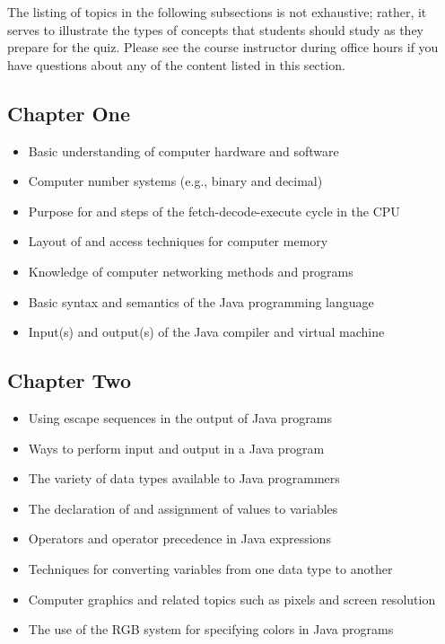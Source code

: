 The listing of topics in the following subsections is not exhaustive; rather, it serves to illustrate the types of
concepts that students should study as they prepare for the quiz. Please see the course instructor during office hours
if you have questions about any of the content listed in this section.

\vspace*{-.1in}
\subsection*{Chapter One}

\begin{itemize}

  \itemsep 0in
  \item Basic understanding of computer hardware and software
  \item Computer number systems (e.g., binary and decimal)
  \item Purpose for and steps of the fetch-decode-execute cycle in the CPU
  \item Layout of and access techniques for computer memory
  \item Knowledge of computer networking methods and programs
  \item Basic syntax and semantics of the Java programming language
  \item Input(s) and output(s) of the Java compiler and virtual machine

  \end{itemize}

\vspace*{-.2in}
\subsection*{Chapter Two}

\begin{itemize}

  \itemsep 0in
  \item Using escape sequences in the output of Java programs
  \item Ways to perform input and output in a Java program
  \item The variety of data types available to Java programmers
  \item The declaration of and assignment of values to variables
  \item Operators and operator precedence in Java expressions
  \item Techniques for converting variables from one data type to another
  \item Computer graphics and related topics such as pixels and screen resolution
  \item The use of the RGB system for specifying colors in Java programs

  \end{itemize}



